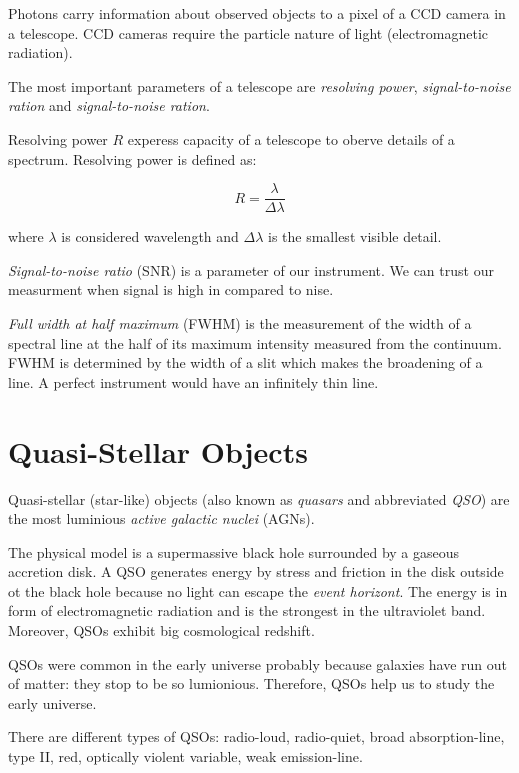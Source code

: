 Photons carry information about observed objects
to a pixel of a CCD camera in a telescope.
CCD cameras require the particle nature of light (electromagnetic radiation).~\cite{trypsteen2017}

The most important parameters of a telescope are
\textit{resolving power}, \textit{signal-to-noise ration}
and \textit{signal-to-noise ration}.

Resolving power \(R\) experess capacity of a telescope to oberve details of a spectrum.
Resolving power is defined as:

\begin{equation}
	R = \frac{\lambda}{\Delta \lambda}
\end{equation}

where \(\lambda\) is considered wavelength
and \(\Delta \lambda\) is the smallest visible detail.

\textit{Signal-to-noise ratio} (SNR) is a parameter of our instrument.
We can trust our measurment when signal is high in compared to nise.~\cite{cochard2018}

\textit{Full width at half maximum} (FWHM) is the measurement of the width of a spectral line
at the half of its maximum intensity measured from the continuum.
FWHM is determined by the width of a slit which makes the broadening of a line.
A perfect instrument would have an infinitely thin line.

\section{Quasi-Stellar Objects}

Quasi-stellar (star-like) objects (also known as \textit{quasars} and abbreviated \textit{QSO}) are the most luminious \textit{active galactic nuclei} (AGNs).~\cite{beckmann2013}

The physical model is a supermassive black hole surrounded by a gaseous accretion disk.
A QSO generates energy by stress and friction in the disk outside ot the black hole because no light can escape the \textit{event horizont}.
The energy is in form of electromagnetic radiation and is the strongest in the ultraviolet band.
Moreover, QSOs exhibit big cosmological redshift.

QSOs were common in the early universe probably because galaxies have run out of matter: they stop to be so lumionious.
Therefore, QSOs help us to study the early universe.

There are different types of QSOs: radio-loud, radio-quiet, broad absorption-line, type II, red, optically violent variable, weak emission-line.

